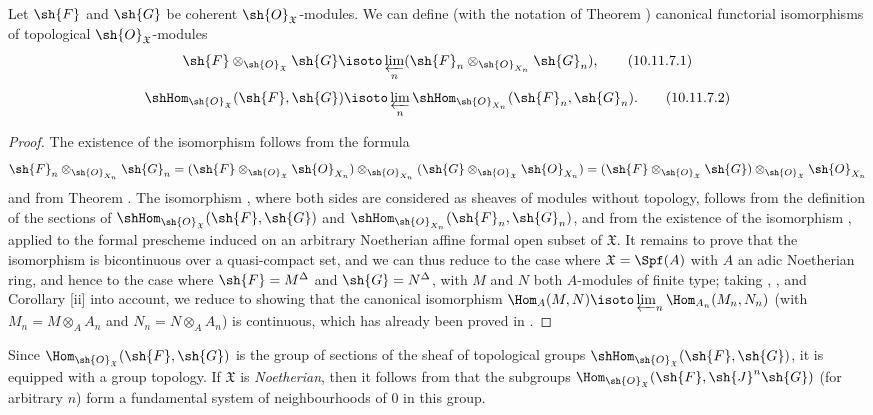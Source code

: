 \begin{proposition}[10.11.7]
\label{I.10.11.7}
Let $\sh{F}$ and $\sh{G}$ be coherent $\sh{O}_\mathfrak{X}$-modules.
We can define (with the notation of Theorem ) canonical functorial isomorphisms of topological $\sh{O}_\mathfrak{X}$-modules 
\[
\label{I.10.11.7.1}
  \sh{F}\otimes_{\sh{O}_\mathfrak{X}}\sh{G}\isoto\varprojlim_n(\sh{F}_n\otimes_{\sh{O}_{X_n}}\sh{G}_n),
  \tag{10.11.7.1}
\]
\[
\label{I.10.11.7.2}
  \shHom_{\sh{O}_\mathfrak{X}}(\sh{F},\sh{G})\isoto\varprojlim_n\shHom_{\sh{O}_{X_n}}(\sh{F}_n,\sh{G}_n).
  \tag{10.11.7.2}
\]
\end{proposition}

\begin{proof}
The existence of the isomorphism  follows from the formula
\[
  \sh{F}_n\otimes_{\sh{O}_{X_n}}\sh{G}_n=(\sh{F}\otimes_{\sh{O}_\mathfrak{X}}\sh{O}_{X_n})\otimes_{\sh{O}_{X_n}}(\sh{G}\otimes_{\sh{O}_\mathfrak{X}}\sh{O}_{X_n})=(\sh{F}\otimes_{\sh{O}_\mathfrak{X}}\sh{G})\otimes_{\sh{O}_\mathfrak{X}}\sh{O}_{X_n}
\]
and from Theorem .
The isomorphism , where both sides are considered as sheaves of modules without topology, follows from the definition of the sections of $\shHom_{\sh{O}_\mathfrak{X}}(\sh{F},\sh{G})$ and $\shHom_{\sh{O}_{X_n}}(\sh{F}_n,\sh{G}_n)$, and from the existence of the isomorphism , applied to the formal prescheme induced on an arbitrary Noetherian affine formal open subset of $\mathfrak{X}$.
It remains to prove that the isomorphism  is bicontinuous over a quasi-compact set, and we can thus reduce to the case where $\mathfrak{X}=\Spf(A)$ with $A$ an adic Noetherian ring, and hence  to the case where $\sh{F}=M^\Delta$ and $\sh{G}=N^\Delta$, with $M$ and $N$ both $A$-modules of finite type; taking , , and Corollary [ii] into account, we reduce to showing that the canonical isomorphism $\Hom_A(M,N)\isoto\varprojlim_n\Hom_{A_n}(M_n,N_n)$ (with $M_n=M\otimes_A A_n$ and $N_n=N\otimes_A A_n$) is continuous, which has already been proved in .
\end{proof}

\begin{env}[10.11.8]
\label{I.10.11.8}
Since $\Hom_{\sh{O}_\mathfrak{X}}(\sh{F},\sh{G})$ is the group of sections of the sheaf of topological groups $\shHom_{\sh{O}_\mathfrak{X}}(\sh{F},\sh{G})$, it is equipped with a group topology.
If $\mathfrak{X}$ is \emph{Noetherian}, then it follows from  that the subgroups $\Hom_{\sh{O}_\mathfrak{X}}(\sh{F},\sh{J}^n\sh{G})$ (for arbitrary $n$) form a fundamental system of neighbourhoods of $0$ in this group.
\end{env}

